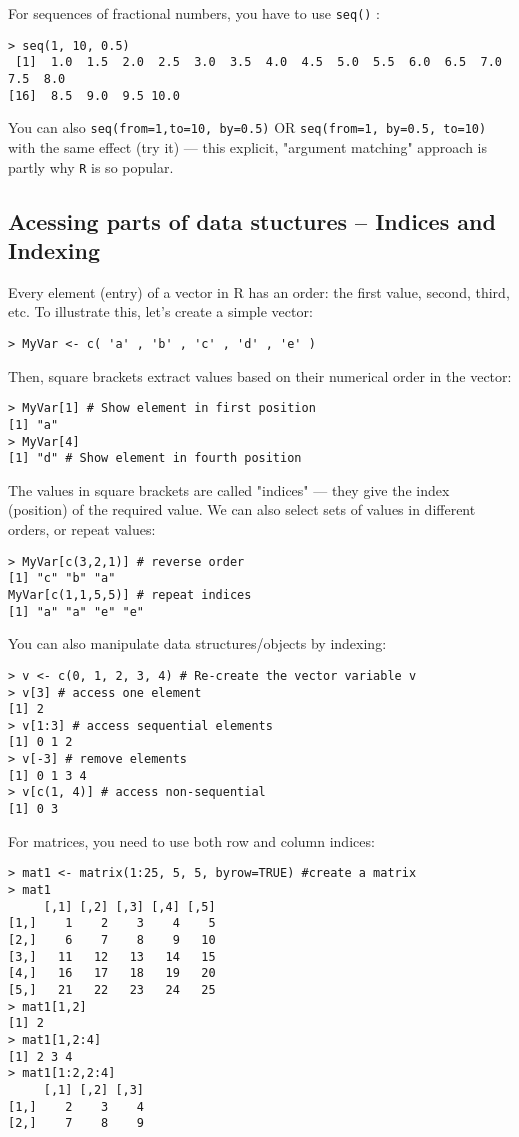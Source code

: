 For sequences of fractional numbers, you have to use {\tt seq()} :

\begin{lstlisting}
> seq(1, 10, 0.5)
 [1]  1.0  1.5  2.0  2.5  3.0  3.5  4.0  4.5  5.0  5.5  6.0  6.5  7.0  7.5  8.0
[16]  8.5  9.0  9.5 10.0
\end{lstlisting}

You can also {\tt seq(from=1,to=10, by=0.5)} OR {\tt seq(from=1, 
by=0.5, to=10)} with the same effect (try it) --- this explicit, 
"argument matching" approach is partly why {\tt R} is so popular.

\subsection{Acessing parts of data stuctures -- Indices and Indexing}
Every element (entry) of a vector in R has an order: the first value, 
second, third, etc. To illustrate this, let's create a simple vector:
\begin{lstlisting}
> MyVar <- c( 'a' , 'b' , 'c' , 'd' , 'e' )
\end{lstlisting}
Then, square brackets extract values based on their numerical order 
in the vector:
\begin{lstlisting}
> MyVar[1] # Show element in first position 
[1] "a"
> MyVar[4]
[1] "d" # Show element in fourth position 
\end{lstlisting}
The values in square brackets are called "indices" --- they 
give the index (position) of the required value. We can also select 
sets of values in different orders, or repeat values:
\begin{lstlisting}
> MyVar[c(3,2,1)] # reverse order
[1] "c" "b" "a"
MyVar[c(1,1,5,5)] # repeat indices
[1] "a" "a" "e" "e"
\end{lstlisting}

You can also manipulate data structures/objects by indexing:

\begin{lstlisting}
> v <- c(0, 1, 2, 3, 4) # Re-create the vector variable v
> v[3] # access one element
[1] 2
> v[1:3] # access sequential elements
[1] 0 1 2
> v[-3] # remove elements
[1] 0 1 3 4
> v[c(1, 4)] # access non-sequential
[1] 0 3
\end{lstlisting}

For matrices, you need to use both row and column indices:
\begin{lstlisting}	
> mat1 <- matrix(1:25, 5, 5, byrow=TRUE) #create a matrix
> mat1
	 [,1] [,2] [,3] [,4] [,5]
[1,]    1    2    3    4    5
[2,]    6    7    8    9   10
[3,]   11   12   13   14   15
[4,]   16   17   18   19   20
[5,]   21   22   23   24   25
> mat1[1,2]
[1] 2
> mat1[1,2:4]
[1] 2 3 4
> mat1[1:2,2:4]
	 [,1] [,2] [,3]
[1,]    2    3    4
[2,]    7    8    9
\end{lstlisting}

